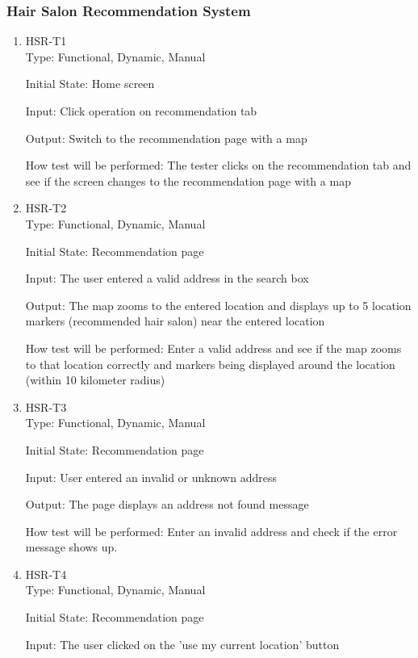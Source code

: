 \documentclass[12pt, titlepage]{article}
\begin{document}
\subsubsection{Hair Salon Recommendation System}
\begin{enumerate}
\item{HSR-T1}\\
Type: Functional, Dynamic, Manual
					
Initial State: Home screen
					
Input: Click operation on recommendation tab
					
Output: Switch to the recommendation page with a map
					
How test will be performed: The tester clicks on the recommendation tab and see if the screen changes to the recommendation page with a map
				
\item{HSR-T2}\\
Type: Functional, Dynamic, Manual
					
Initial State: Recommendation page
					
Input: The user entered a valid address in the search box
					
Output: The map zooms to the entered location and displays up to 5 location markers (recommended hair salon) near the entered location
					
How test will be performed: Enter a valid address and see if the map zooms to that location correctly and markers being displayed around the location (within 10 kilometer radius)

\item{HSR-T3}\\
Type: Functional, Dynamic, Manual
					
Initial State: Recommendation page
					
Input: User entered an invalid or unknown address
					
Output: The page displays an address not found message
					
How test will be performed: Enter an invalid address and check if the error message shows up.

\item{HSR-T4}\\
Type: Functional, Dynamic, Manual
					
Initial State: Recommendation page
					
Input: The user clicked on the 'use my current location' button
					

\end{enumerate}
\end{document}
